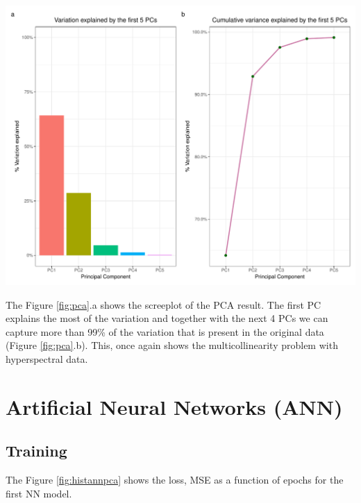 \documentclass[a4paper, twoside]{templates/ociamthesis}
\let\origfigure\figure
\let\endorigfigure\endfigure
\renewenvironment{figure}[1][2] {
    \expandafter\origfigure\expandafter[H]
} {
    \endorigfigure
}
\begin{document}
\begin{figure}
\includegraphics[width=0.9\linewidth]{./figures/pca} \caption{Principal Component Analysis: a) Screeplot, b) Cumulative variance explained by the first 5 PCs}\label{fig:pca}
\end{figure}

The Figure \ref{fig:pca}.a shows the screeplot of the PCA result. The first PC explains the most of the variation and together with the next 4 PCs we can capture more than 99\% of the variation that is present in the original data (Figure \ref{fig:pca}.b). This, once again shows the multicollinearity problem with hyperspectral data.

\newpage

\hypertarget{artificial-neural-networks-ann-1}{%
\section{Artificial Neural Networks (ANN)}\label{artificial-neural-networks-ann-1}}

\hypertarget{training}{%
\subsection{Training}\label{training}}

The Figure \ref{fig:histannpca} shows the loss, MSE as a function of epochs for the first NN model.
\end{document}

